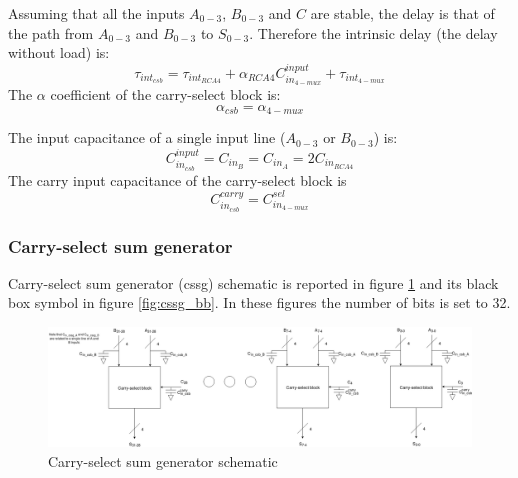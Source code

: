 Assuming that all the inputs $A_{0-3}$, $B_{0-3}$ and $C$ are stable, the delay is that of the path from $A_{0-3}$ and $B_{0-3}$ to $S_{0-3}$. Therefore the intrinsic delay (the delay without load) is:
\begin{equation}
\tau_{int_{csb}} = \tau_{int_{RCA4}} + \alpha_{RCA4} C_{in_{4-mux}}^{input} + \tau_{int_{4-mux}}
\end{equation}
The $\alpha$ coefficient of the carry-select block is:
\begin{equation}
\alpha_{csb} = \alpha_{4-mux}
\end{equation}

The input capacitance of a single input line ($A_{0-3}$ or $B_{0-3}$) is:
\begin{equation}
C_{in_{csb}}^{input} = C_{in_B} = C_{in_A} = 2 C_{in_{RCA4}}
\end{equation}
The carry input capacitance of the carry-select block is
\begin{equation}
C_{in_{csb}}^{carry} = C_{in_{4-mux}}^{sel}
\end{equation}





\subsubsection{Carry-select sum generator}
Carry-select sum generator (cssg) schematic is reported in figure \ref{fig:cssg_schematic} and its black box symbol in figure \ref{fig:cssg_bb}. In these figures the number of bits is set to 32.

\begin{figure}[H]
\centering
\includegraphics[width = 14 cm, height = 6 cm]{pentium/carry_select_sum_generator_schematic.png}
\caption{Carry-select sum generator schematic}
\label{fig:cssg_schematic}
\end{figure}

